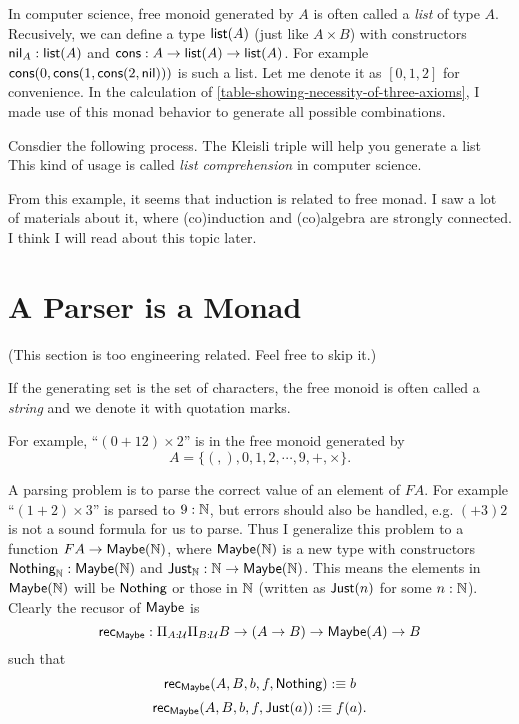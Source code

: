 \newcommand{\listtype}{\name{list}}
\newcommand{\nil}{\name{nil}}
\newcommand{\cons}{\name{cons}}

In computer science, free monoid generated by $A$ is often called a 
{\it list} of type $A$. Recusively, we can define a type $\listtype(A)$ 
(just like $A\times B$) with constructors $\nil_A: \listtype(A)$ and 
$\cons:A\to\listtype(A)\to\listtype(A)$. For example 
$\cons(0,\cons(1, \cons(2, \nil)))$ is such a list. Let me denote 
it as $[0,1,2]$ for convenience. In the calculation of
\cref{table-showing-necessity-of-three-axioms}, I made use of this
monad behavior to generate all possible combinations. 

Consdier the following process.
The Kleisli triple will help you generate a list
This kind of usage is called {\it list comprehension} in computer 
science. 

From this example, it seems that induction is related to free monad. 
I saw a lot of materials about it, where (co)induction and (co)algebra 
are strongly connected. I think I will read about this topic later. 

\section{A Parser is a Monad}

(This section is too engineering related. Feel free to skip it.)

If the generating set is the set of characters, the free monoid is
often called a {\it string} and we denote it with quotation marks.

For example, ``$(0+12)\times2$'' is in the free monoid generated by 
$$A=\{(,),0,1,2,\cdots,9,+,\times\}.$$

\newcommand{\Maybe}{\name{Maybe}}
\newcommand{\Nothing}{\name{Nothing}}
\newcommand{\Just}{\name{Just}}

A parsing problem is to parse the correct value of an element
of $FA$. For example ``$(1+2)\times 3$'' is parsed to $9:\mathbb{N}$,
but errors should also be handled, e.g. $(+3)2$ is not a sound
formula for us to parse. Thus I generalize this problem to a
function $FA\to \Maybe(\nat)$, where $\Maybe(\nat)$ is a new type with
constructors $\Nothing_\nat:\Maybe(\nat)$ and 
$\Just_\nat: \nat\to \Maybe(\nat)$. This means the elements in $\Maybe(\nat)$
will be $\Nothing$ or those in $\mathbb{N}$ (written as $\Just(n)$ for some 
$n:\mathbb{N}$). Clearly the recusor of $\Maybe$ is 
$$
    \rec_\Maybe: \Pi_{A:\universe}\Pi_{B:\universe}
        B\to
        (A\to B)\to 
        \Maybe(A)\to B
$$
such that
$$
    \rec_\Maybe(A,B,b,f,\Nothing) \defn b
$$
$$
    \rec_\Maybe(A,B,b,f,\Just(a)) \defn f(a).
$$

